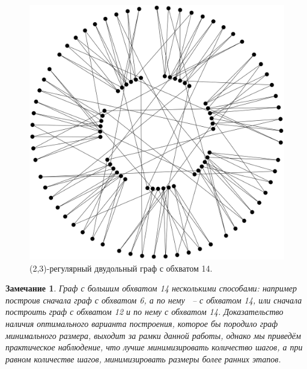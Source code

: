 \documentclass[14pt]{mmcs-article}
\newtheorem{notice}{Замечание}
\begin{document}
\begin{figure}[H]
    \centering
    \includegraphics[scale=0.2]{graph_3.png}
    \caption{ (2,3)-регулярный двудольный граф с обхватом 14. }
    \label{be_not_afraid_2}
\end{figure}


\begin{notice}
    Граф с большим обхватом 14 несколькими способами: например построив сначала граф с обхватом 6, а по нему ~-- с обхватом 14, или сначала построить граф с обхватом 12 и по нему с обхватом 14. Доказательство наличия оптимального варианта построения, которое бы породило граф минимального размера, выходит за рамки данной работы, однако мы приведём практическое наблюдение, что лучше минимизировать количество шагов, а при равном количестве шагов, минимизировать размеры более ранних этапов.
\end{notice}

\newpage

\renewcommand{\refname}{\centering \textbf{Литература}}
\end{document}
